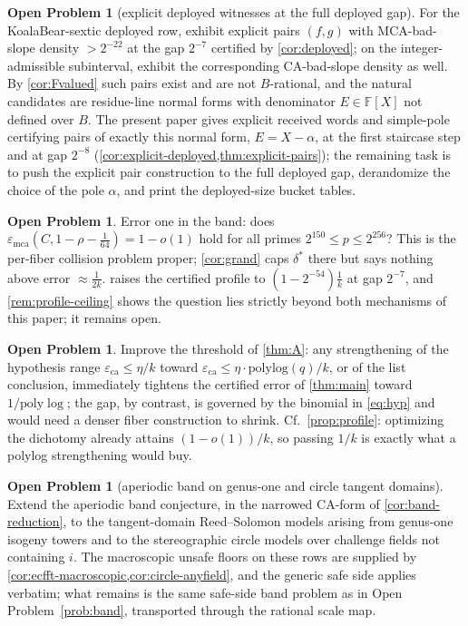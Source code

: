 \documentclass[11pt]{article}
\theoremstyle{definition}
\newtheorem{problem}[theorem]{Open Problem}
\theoremstyle{remark}
\newcommand{\F}{\mathbb{F}}
\newcommand{\B}{B}
\newcommand{\eca}{\varepsilon_{\mathrm{ca}}}
\newcommand{\emca}{\varepsilon_{\mathrm{mca}}}
\begin{document}
\begin{problem}[explicit deployed witnesses at the full deployed gap]\label{prob:explicit}
For the KoalaBear-sextic deployed row, exhibit explicit pairs $(f,g)$ with MCA-bad-slope density $>2^{-22}$ at the gap $2^{-7}$ certified by \cref{cor:deployed}; on the integer-admissible subinterval, exhibit the corresponding CA-bad-slope density as well.  By \cref{cor:Fvalued} such pairs exist and are not $\B$-rational, and the natural candidates are residue-line normal forms with denominator $E\in\F[X]$ not defined over $\B$.  The present paper gives explicit received words and simple-pole certifying pairs of exactly this normal form, $E=X-\alpha$, at the first staircase step and at gap $2^{-8}$ \textup(\cref{cor:explicit-deployed,thm:explicit-pairs}\textup); the remaining task is to push the explicit pair construction to the full deployed gap, derandomize the choice of the pole $\alpha$, and print the deployed-size bucket tables.
\end{problem}

\begin{problem}\label{prob:errorone}
Error one in the band: does $\emca(C,1-\rho-\frac1{64})=1-o(1)$ hold for all primes $2^{150}\le p\le2^{256}$? This is the per-fiber collision problem proper; \cref{cor:grand} caps $\delta^*$ there but says nothing above error $\approx\frac1{2k}$.   raises the certified profile to $(1-2^{-54})\frac1k$ at gap $2^{-7}$, and \cref{rem:profile-ceiling} shows the question lies strictly beyond both mechanisms of this paper; it remains open.
\end{problem}

\begin{problem}
Improve the threshold of \cref{thm:A}: any strengthening of the hypothesis range $\eca\le\eta/k$ toward $\eca\le\eta\cdot\mathrm{polylog}(q)/k$, or of the list conclusion, immediately tightens the certified error of \cref{thm:main} toward $1/\mathrm{poly}\log$; the gap, by contrast, is governed by the binomial in \eqref{eq:hyp} and would need a denser fiber construction to shrink.  Cf.\ \cref{prop:profile}: optimizing the dichotomy already attains $(1-o(1))/k$, so passing $1/k$ is exactly what a polylog strengthening would buy.
\end{problem}

\begin{problem}[aperiodic band on genus-one and circle tangent domains]\label{prob:isogeny}
Extend the aperiodic band conjecture, in the narrowed CA-form of \cref{cor:band-reduction}, to the tangent-domain Reed--Solomon models arising from genus-one isogeny towers and to the stereographic circle models over challenge fields not containing $i$.  The macroscopic unsafe floors on these rows are supplied by \cref{cor:ecfft-macroscopic,cor:circle-anyfield}, and the generic safe side applies verbatim; what remains is the same safe-side band problem as in Open Problem~\ref{prob:band}, transported through the rational scale map.
\end{problem}
\end{document}
